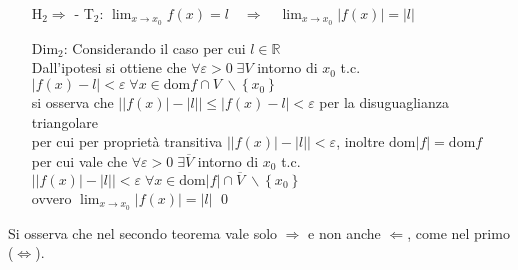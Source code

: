 \documentclass[a4paper]{article}
\newcommand\dom{\text{dom}}
\begin{document}
\begin{itemize}
	\item[H\(_2 \Rightarrow\) - T\(_2\):] \(\displaystyle \lim_{x \to x_0} f(x) = l \quad \Rightarrow \quad \lim_{x \to x_0} \left| f(x) \right| = \left| l \right|\)
	\item[Dim\(_2\):] Considerando il caso per cui \(l \in \mathbb{R}\) \\
	Dall'ipotesi si ottiene che \(\forall \varepsilon > 0 \; \exists V\) intorno di \(x_0\) t.c. \(\left| f(x) - l \right| < \varepsilon \; \forall x \in \dom f \cap V \; \backslash \left\{ x_0 \right\}\) \\
	si osserva che \(\left| \left| f(x) \right| - \left| l \right| \right| \leq \left| f(x) - l \right| < \varepsilon\) per la disuguaglianza triangolare \\
	per cui per proprietà transitiva \(\left| \left| f(x) \right| - \left| l \right| \right| < \varepsilon\), inoltre \(\dom \left| f \right| = \dom f\)\\
	per cui vale che \( \forall \varepsilon > 0 \; \exists \overline{V}\) intorno di \(x_0\) t.c. \(\left| \left| f(x) \right| - \left| l \right| \right| < \varepsilon \; \forall x \in \dom \left| f \right| \cap \overline{V} \; \backslash \left\{ x_0 \right\}\) \\
	ovvero \(\displaystyle \lim_{x \to x_0} \left| f(x) \right| = \left| l \right|\) \qed
\end{itemize}
Si osserva che nel secondo teorema vale solo \(\Rightarrow\) e non anche \(\Leftarrow\), come nel primo (\(\Leftrightarrow\)). 
\newpage
\end{document}
